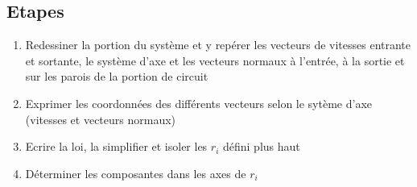 \subsection*{Etapes}
\begin{enumerate}
	\item Redessiner la portion du système et y repérer les vecteurs de vitesses entrante et sortante, le système d'axe et les vecteurs normaux à l'entrée, à la sortie et sur les parois de la portion de circuit
	\item Exprimer les coordonnées des différents vecteurs selon le sytème d'axe (vitesses et vecteurs normaux)
	\item Ecrire la loi, la simplifier et isoler les $r_i$ défini plus haut
	\item Déterminer les composantes dans les axes de $r_i$
\end{enumerate}